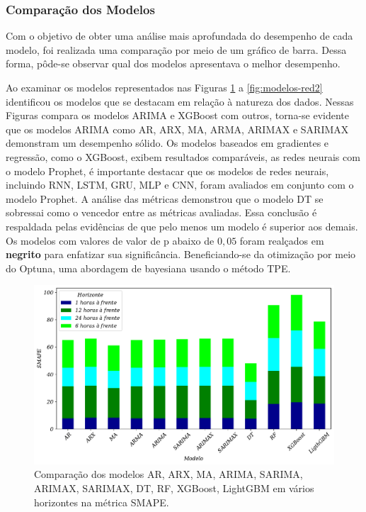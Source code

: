 \subsubsection{Compara\c c\~ao dos Modelos}

Com o objetivo de obter uma análise mais aprofundada do desempenho de cada modelo, foi realizada uma comparação por meio de um gráfico de barra. Dessa forma, pôde-se observar qual dos modelos apresentava o melhor desempenho.

Ao examinar os modelos representados nas Figuras \ref{fig:modelos-arima1} a \ref{fig:modelos-red2} identificou os modelos que se destacam em relação à natureza dos dados. Nessas Figuras compara os modelos ARIMA e XGBoost com outros, torna-se evidente que os modelos ARIMA como AR, ARX, MA, ARMA, ARIMAX e SARIMAX demonstram um desempenho sólido. Os modelos baseados em gradientes e regressão, como o XGBoost, exibem resultados comparáveis, as redes neurais com o modelo Prophet, é importante destacar que os modelos de redes neurais, incluindo RNN, LSTM, GRU, MLP e CNN, foram avaliados em conjunto com o modelo Prophet. A análise das métricas demonstrou que o modelo DT se sobressai como o vencedor entre as métricas avaliadas. Essa conclusão é respaldada pelas evidências de que pelo menos um modelo é superior aos demais. Os modelos com valores de valor de p abaixo de $0,05$ foram realçados em \textbf{negrito} para enfatizar sua significância. Beneficiando-se da otimização por meio do Optuna, uma abordagem de bayesiana usando o método TPE.



\begin{figure}[H]
	\centering
	\caption{Comparação dos modelos AR, ARX, MA, ARIMA, SARIMA, ARIMAX, SARIMAX, DT, RF, XGBoost, LightGBM em vários horizontes na métrica SMAPE.}\label{fig:modelos-arima1}
	\includegraphics[width=0.7\linewidth]{Resultados/Figuras/smape_comparar_basic}
	
	
\end{figure}

